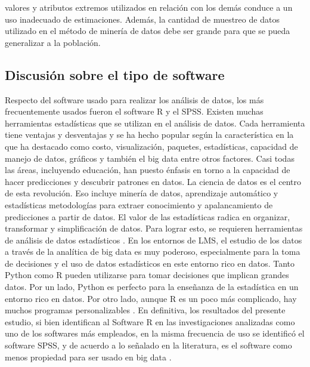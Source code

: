 \documentclass[spanish]{textolivre}
\begin{document}
valores y atributos extremos utilizados en relación con los demás conduce a un uso inadecuado de estimaciones. Además, la cantidad de muestreo de datos utilizado en el método de minería de datos debe ser grande para que se pueda generalizar a la población.

\subsection*{Discusión sobre el tipo de software}
Respecto del software usado para realizar los análisis de datos, los más frecuentemente usados fueron el software R y el SPSS. Existen muchas herramientas estadísticas que se utilizan en el análisis de datos. Cada herramienta tiene ventajas y desventajas y se ha hecho popular según la característica en la que ha destacado como costo, visualización, paquetes, estadísticas, capacidad de manejo de datos, gráficos y también el big data entre otros factores. Casi todas las áreas, incluyendo educación, han puesto énfasis en torno a la capacidad de hacer predicciones y descubrir patrones en datos. La ciencia de datos es el centro de esta revolución. Eso incluye minería de datos, aprendizaje automático y estadísticas metodologías para extraer conocimiento y apalancamiento de predicciones a partir de datos. El valor de las estadísticas radica en organizar, transformar y simplificación de datos. Para lograr esto, se requieren herramientas de análisis de datos estadísticos \cite{bansal2018}. En los entornos de LMS, el estudio de los datos a través de la analítica de big data es muy poderoso, especialmente para la toma de decisiones y el uso de datos estadísticos en este entorno rico en datos. Tanto Python como R pueden utilizarse para tomar decisiones que implican grandes datos. Por un lado, Python es perfecto para la enseñanza de la estadística en un entorno rico en datos. Por otro lado, aunque R es un poco más complicado, hay muchos programas personalizables \cite{colliau2021}. En definitiva, los resultados del presente estudio, si bien identifican al Software R en las investigaciones analizadas como uno de los softwares más empleados, en la misma frecuencia de uso se identificó el software SPSS, y de acuerdo a lo señalado en la literatura, es el software como menos propiedad para ser usado en big data \cite{bansal2018}.
\end{document}
